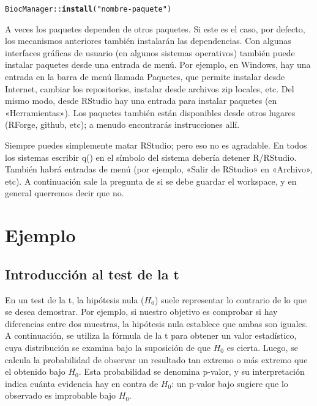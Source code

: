 \documentclass{config/apuntes}\usepackage[]{graphicx}\usepackage[]{xcolor}
\makeatletter
\newcommand{\hlsng}[1]{\textcolor[rgb]{0.192,0.494,0.8}{#1}}%
\newcommand{\hlopt}[1]{\textcolor[rgb]{0,0,0}{#1}}%
\newcommand{\hldef}[1]{\textcolor[rgb]{0.345,0.345,0.345}{#1}}%
\newcommand{\hlkwd}[1]{\textcolor[rgb]{0.737,0.353,0.396}{\textbf{#1}}}%
\newenvironment{kframe}{%
 \def\at@end@of@kframe{}%
 \ifinner\ifhmode%
  \def\at@end@of@kframe{\end{minipage}}%
  \begin{minipage}{\columnwidth}%
 \fi\fi%
 \def\FrameCommand##1{\hskip\@totalleftmargin \hskip-\fboxsep
 \colorbox{shadecolor}{##1}\hskip-\fboxsep
     \hskip-\linewidth \hskip-\@totalleftmargin \hskip\columnwidth}%
 \MakeFramed {\advance\hsize-\width
   \@totalleftmargin\z@ \linewidth\hsize
   \@setminipage}}%
 {\par\unskip\endMakeFramed%
 \at@end@of@kframe}
\newenvironment{knitrout}{}{} %
\makeatother
\begin{document}
\begin{knitrout}
\color{fgcolor}\begin{kframe}
\begin{alltt}
\hldef{BiocManager}\hlopt{::}\hlkwd{install}\hldef{(}\hlsng{"nombre-paquete"}\hldef{)}
\end{alltt}
\end{kframe}
\end{knitrout}

A veces los paquetes dependen de otros paquetes. Si este es el caso, por defecto, los mecanismos anteriores también instalarán las dependencias. Con algunas interfaces gráficas de usuario (en algunos sistemas operativos) también puede instalar paquetes desde una entrada de menú. Por ejemplo, en Windows, hay una entrada en la barra de menú llamada Paquetes, que permite instalar desde Internet, cambiar los repositorios, instalar desde archivos zip locales, etc. Del mismo modo, desde RStudio hay una entrada para instalar paquetes (en «Herramientas»). Los paquetes también están disponibles desde otros lugares (RForge, github, etc); a menudo encontrarás instrucciones allí.

Siempre puedes simplemente matar RStudio; pero eso no es agradable. En todos los sistemas escribir q() en el símbolo del sistema debería detener R/RStudio. También habrá entradas de menú (por ejemplo, «Salir de RStudio» en «Archivo», etc). A continuación sale la pregunta de si se debe guardar el workspace, y en general querremos decir que no.

\section{Ejemplo}
\subsection{Introducción al test de la t}
En un test de la t, la hipótesis nula ($H_0$) suele representar lo contrario de lo que se desea demostrar. Por ejemplo, si nuestro objetivo es comprobar si hay diferencias entre dos muestras, la hipótesis nula establece que ambas son iguales. A continuación, se utiliza la fórmula de la t para obtener un valor estadístico, cuya distribución se examina bajo la suposición de que $H_0$ es cierta. Luego, se calcula la probabilidad de observar un resultado tan extremo o más extremo que el obtenido bajo $H_0$. Esta probabilidad se denomina p-valor, y su interpretación indica cuánta evidencia hay en contra de $H_0$: un p-valor bajo sugiere que lo observado es improbable bajo $H_0$.
\end{document}
